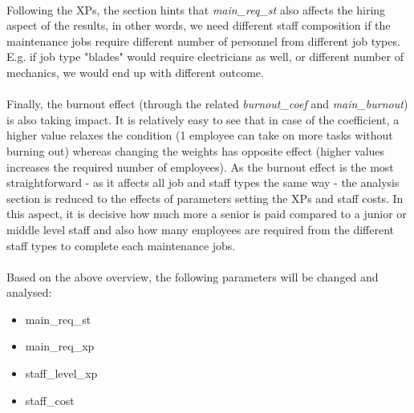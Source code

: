     \paragraph{} Following the XPs, the  section hints that 
    \textit{main\_req\_st} also affects the hiring aspect of the results, in other words, we need 
    different staff composition if the maintenance jobs require different number of personnel from 
    different job types. E.g. if job type "blades" would require electricians as well, or different 
    number of mechanics, we would end up with different outcome.

    \paragraph{} Finally, the burnout effect (through the related \textit{burnout\_coef} and 
    \textit{main\_burnout}) is also taking impact. It is relatively easy to see that in case 
    of the coefficient, a higher value relaxes the condition (1 employee can take on more tasks
    without burning out) whereas changing the weights has opposite effect (higher values increases
    the required number of employees). As the burnout effect is the most straightforward - as it 
    affects all job and staff types the same way - the analysis section is reduced to the effects 
    of parameters setting the XPs and staff costs. In this aspect, it is decisive how much more a 
    senior is paid compared to a junior or middle level staff and also how many employees are 
    required from the different staff types to complete each maintenance jobs.

    \paragraph{} Based on the above overview, the following parameters will be changed and analysed:
    \begin{itemize}
        \item main\_req\_st
        \item main\_req\_xp
        \item staff\_level\_xp
        \item staff\_cost
    \end{itemize}


